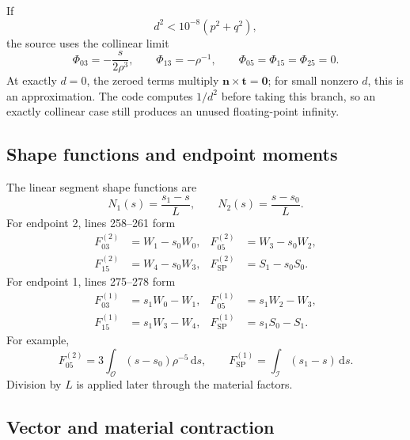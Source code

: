 \documentclass[11pt]{article}
\newcommand{\vect}[1]{\bm{#1}}
\newcommand{\dd}{\,\mathrm{d}}
\begin{document}
If
\[
d^2<10^{-8}(p^2+q^2),
\]
the source uses the collinear limit
\[
\Phi_{03}=-\frac{s}{2\rho^3},
\qquad \Phi_{13}=-\rho^{-1},
\qquad \Phi_{05}=\Phi_{15}=\Phi_{25}=0.
\]
At exactly \(d=0\), the zeroed terms multiply
\(\vect{n}\times\vect{t}=\vect{0}\); for small nonzero \(d\), this is an
approximation.  The code computes \(1/d^2\) before taking this branch, so an
exactly collinear case still produces an unused floating-point infinity.

\subsection{Shape functions and endpoint moments}

The linear segment shape functions are
\begin{equation}
N_1(s)=\frac{s_1-s}{L},
\qquad
N_2(s)=\frac{s-s_0}{L}.
\label{eq:shape-functions}
\end{equation}
For endpoint 2, lines 258--261 form
\begin{align}
F_{03}^{(2)}&=W_1-s_0W_0,
&F_{05}^{(2)}&=W_3-s_0W_2,\nonumber\\
F_{15}^{(2)}&=W_4-s_0W_3,
&F_{\mathrm{SP}}^{(2)}&=S_1-s_0S_0.
\label{eq:endpoint2-moments}
\end{align}
For endpoint 1, lines 275--278 form
\begin{align}
F_{03}^{(1)}&=s_1W_0-W_1,
&F_{05}^{(1)}&=s_1W_2-W_3,\nonumber\\
F_{15}^{(1)}&=s_1W_3-W_4,
&F_{\mathrm{SP}}^{(1)}&=s_1S_0-S_1.
\label{eq:endpoint1-moments}
\end{align}
For example,
\[
F_{05}^{(2)}=3\int_{\mathcal O}(s-s_0)\rho^{-5}\dd s,
\qquad
F_{\mathrm{SP}}^{(1)}=\int_{\mathcal I}(s_1-s)\dd s.
\]
Division by \(L\) is applied later through the material factors.

\subsection{Vector and material contraction}
\end{document}
